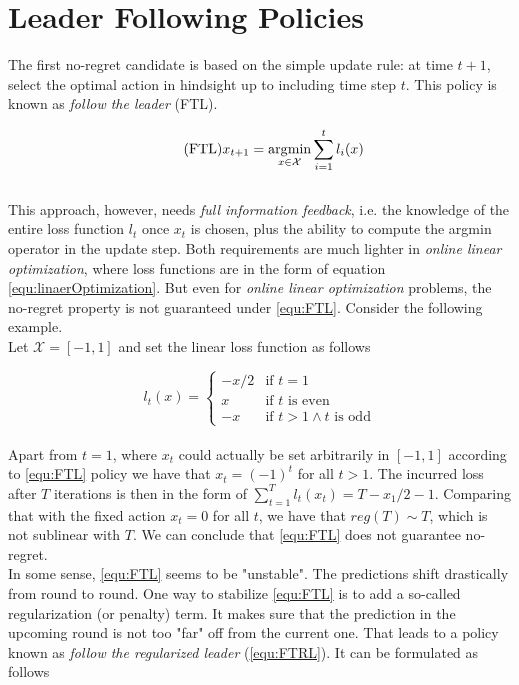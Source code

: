 \section{Leader Following Policies}\label{section:LeaderFollowingPolocies}

The first no-regret candidate is based on the simple update rule: at time $t+1$, select the optimal action in hindsight up to including time step $t$. This policy is known as \textit{follow the leader} (FTL). 

\begin{equation}
    \tag{FTL}
    x_{t+1} = \operatorname*{\arg\!\min}_{x \in \mathcal{X}} \sum_{i=1}^t l_i(x)
    \label{equ:FTL}
\end{equation} \\

This approach, however, needs \textit{full information feedback}, i.e. the knowledge of the entire loss function $l_t$ once $x_t$ is chosen, plus the ability to compute the argmin operator in the update step. Both requirements are much lighter in \textit{online linear optimization}, where loss functions are in the form of equation \ref{equ:linaerOptimization}. But even for \textit{online linear optimization} problems, the no-regret property is not guaranteed under \ref{equ:FTL}. Consider the following example. \\

Let $\mathcal{X} = [-1,1]$ and set the linear loss function as follows

\begin{equation*}
    l_t(x) = \begin{cases}
    -x/2 &\text{if $t = 1$}\\
    x &\text{if $t$ is even}\\
    -x &\text{if $t > 1 \land t$ is odd}
    \end{cases}
\end{equation*} \\

Apart from $t = 1$, where $x_t$ could actually be set arbitrarily in $[-1,1]$ according to \ref{equ:FTL} policy we have that $x_t = (-1)^t$ for all $t > 1$. The incurred loss after $T$ iterations is then in the form of $\sum_{t=1}^T l_t(x_t) = T - x_1/2 -1$. Comparing that with the fixed action $x_t = 0$ for all $t$, we have that $reg(T) \sim T$, which is not sublinear with $T$. We can conclude that \ref{equ:FTL} does not guarantee no-regret. \\

In some sense, \ref{equ:FTL} seems to be "unstable". The predictions shift drastically from round to round. One way to stabilize \ref{equ:FTL} is to add a so-called regularization (or penalty) term. It makes sure that the prediction in the upcoming round is not too "far" off from the current one. That leads to a policy known as \textit{follow the regularized leader} (\ref{equ:FTRL}). It can be formulated as follows

